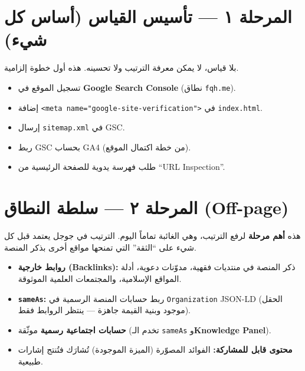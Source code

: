 \documentclass[11pt]{article}
\begin{document}
\section{المرحلة ١ — تأسيس القياس (أساس كل شيء)}

\begin{notebox}
بلا قياس، لا يمكن معرفة الترتيب ولا تحسينه. هذه أول خطوة إلزامية.
\end{notebox}

\begin{itemize}
  \item تسجيل الموقع في \textbf{Google Search Console} (نطاق \texttt{fqh.me}).
  \item إضافة \texttt{<meta name="google-site-verification">} في \texttt{index.html}.
  \item إرسال \texttt{sitemap.xml} في GSC.
  \item ربط GSC بحساب GA4 (من خطة اكتمال الموقع).
  \item طلب فهرسة يدوية للصفحة الرئيسية من ``URL Inspection''.
\end{itemize}

\section{المرحلة ٢ — سلطة النطاق (Off-page)} 

\begin{goalbox}
هذه \textbf{أهم مرحلة} لرفع الترتيب، وهي الغائبة تماماً اليوم. الترتيب في جوجل
يعتمد قبل كل شيء على ``الثقة'' التي تمنحها مواقع أخرى بذكر المنصة.
\end{goalbox}

\begin{itemize}
  \item \textbf{روابط خارجية (Backlinks):} ذكر المنصة في منتديات فقهية، مدوّنات دعوية،
        أدلة المواقع الإسلامية، والمجتمعات العلمية الموثوقة.
  \item \textbf{\texttt{sameAs}:} ربط حسابات المنصة الرسمية في \texttt{Organization} JSON-LD
        (الحقل موجود وبنية القيمة جاهزة — ينتظر الروابط فقط).
  \item \textbf{حسابات اجتماعية رسمية} موثّقة (تخدم الـ \texttt{sameAs} و\textbf{Knowledge Panel}).
  \item \textbf{محتوى قابل للمشاركة:} الفوائد المصوّرة (الميزة الموجودة) تُشارَك فتُنتج إشارات طبيعية.
\end{itemize}
\end{document}
